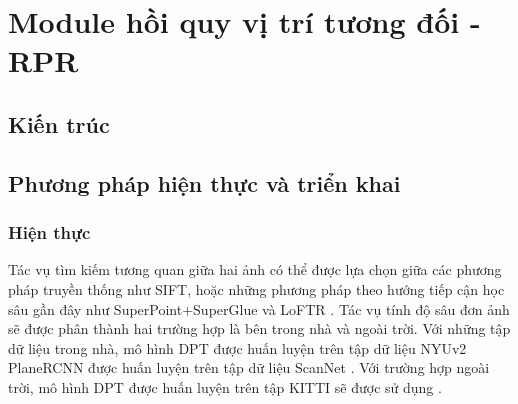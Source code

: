 \section{Module hồi quy vị trí tương đối - RPR}
\subsection{Kiến trúc}



\subsection{Phương pháp hiện thực và triển khai}
\subsubsection{Hiện thực}
Tác vụ tìm kiếm tương quan giữa hai ảnh có thể được lựa chọn giữa các phương pháp truyền thống như SIFT, hoặc những phương pháp theo hướng tiếp cận học sâu gần đây như SuperPoint+SuperGlue \cite{sarlin2020superglue} và LoFTR \cite{sun2021loftr}. Tác vụ tính độ sâu đơn ảnh sẽ được phân thành hai trường hợp là bên trong nhà và ngoài trời. Với những tập dữ liệu trong nhà, mô hình DPT \cite{ranftl2021vision} được huấn luyện trên tập dữ liệu NYUv2 \cite{silberman2012indoor} PlaneRCNN \cite{liu2019planercnn} được huấn luyện trên tập dữ liệu ScanNet \cite{dai2017scannet}. Với trường hợp ngoài trời, mô hình DPT \cite{ranftl2021vision} được huấn luyện trên tập KITTI sẽ được sử dụng \cite{geiger2012we}.

